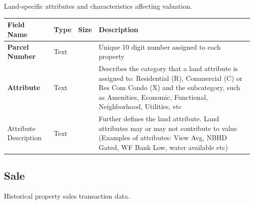 \documentclass[
  english,
  letterpaper,
  DIV=11,
  numbers=noendperiod]{scrreprt}
\begin{document}
Land-specific attributes and characteristics affecting valuation.

\begin{longtable}[]{@{}
  >{\raggedright\arraybackslash}p{}
  >{\raggedright\arraybackslash}p{}
  >{\raggedright\arraybackslash}p{}
  >{\raggedright\arraybackslash}p{}@{}}
\toprule\noalign{}
\begin{minipage}[b]{\linewidth}\raggedright
Field Name
\end{minipage} & \begin{minipage}[b]{\linewidth}\raggedright
Type
\end{minipage} & \begin{minipage}[b]{\linewidth}\raggedright
Size
\end{minipage} & \begin{minipage}[b]{\linewidth}\raggedright
Description
\end{minipage} \\
\midrule\noalign{}
\endhead
\bottomrule\noalign{}
\endlastfoot
\textbf{Parcel Number} & Text & 10 & Unique 10 digit number assigned to
each property \\
\textbf{Attribute} & Text & 30 & Describes the category that a land
attribute is assigned to: Residential (R), Commercial (C) or Res Com
Condo (X) and the subcategory, such as Amenities, Economic, Functional,
Neighborhood, Utilities, etc \\
Attribute Description & Text & 30 & Further defines the land attribute.
Land attributes may or may not contribute to value (Examples of
attributes: View Avg, NBHD Gated, WF Bank Low, water available etc) \\
\end{longtable}

\subsection{Sale}

Historical property sales transaction data.
\end{document}
